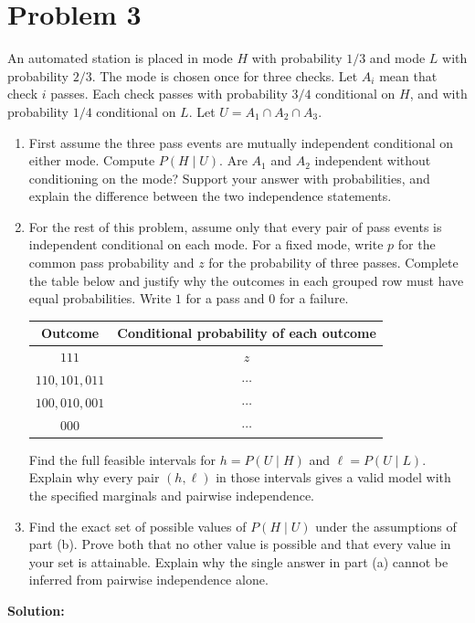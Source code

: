 \documentclass[11pt,a4paper]{article}
\newcommand{\Prob}{P}
\begin{document}
\clearpage
\section*{Problem 3}
An automated station is placed in mode $H$ with probability $1/3$ and mode $L$ with probability $2/3$. The mode is chosen once for three checks. Let $A_i$ mean that check $i$ passes. Each check passes with probability $3/4$ conditional on $H$, and with probability $1/4$ conditional on $L$. Let $U=A_1\cap A_2\cap A_3$.
\begin{enumerate}
\item First assume the three pass events are mutually independent conditional on either mode. Compute $\Prob(H\mid U)$. Are $A_1$ and $A_2$ independent without conditioning on the mode? Support your answer with probabilities, and explain the difference between the two independence statements.
\item For the rest of this problem, assume only that every pair of pass events is independent conditional on each mode. For a fixed mode, write $p$ for the common pass probability and $z$ for the probability of three passes. Complete the table below and justify why the outcomes in each grouped row must have equal probabilities. Write $1$ for a pass and $0$ for a failure.
\begin{center}
\begin{tabular}{cc}
\toprule Outcome & Conditional probability of each outcome\\\midrule
$111$ & $z$\\
$110,101,011$ & $\cdots$\\
$100,010,001$ & $\cdots$\\
$000$ & $\cdots$\\\bottomrule
\end{tabular}
\end{center}
Find the full feasible intervals for $h=\Prob(U\mid H)$ and $\ell=\Prob(U\mid L)$. Explain why every pair $(h,\ell)$ in those intervals gives a valid model with the specified marginals and pairwise independence.
\item Find the exact set of possible values of $\Prob(H\mid U)$ under the assumptions of part (b). Prove both that no other value is possible and that every value in your set is attainable. Explain why the single answer in part (a) cannot be inferred from pairwise independence alone.
\end{enumerate}

\textbf{Solution:}
\end{document}
